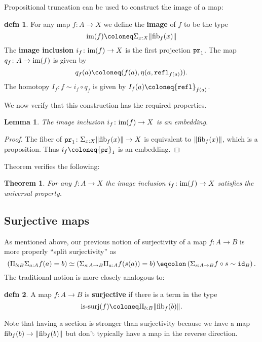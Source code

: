 \documentclass{amsart}
\theoremstyle{theorem}
\newtheorem*{thm}{Theorem}
\newtheorem*{lem}{Lemma}
\theoremstyle{definition}
\newtheorem*{defn}{defn}
\theoremstyle{remark}
\newcommand{\0}{\mathbbe{0}}
\newcommand{\1}{\mathbbe{1}}
\newcommand{\2}{\mathbbe{2}}
\newcommand{\3}{\mathbbe{3}}
\newcommand{\4}{\mathbbe{4}}
\newcommand{\term}[1]{{\textup{\texttt{#1}}}}
\newcommand{\type}[1]{{\textup{#1}}}
\newcommand{\id}{\term{id}}
\newcommand{\pr}{\term{pr}}
\newcommand{\refl}{\term{refl}}
\newcommand{\is}[1]{\type{is-{#1}}}
\newcommand{\fib}{\type{fib}}
\newcommand{\mere}[1]{\|{#1}\|}
\newcommand{\im}[1]{\type{im}(#1)}
\begin{document}
Propositional truncation can be used to construct the image of a map:

\begin{defn} For any map $f \colon A \to X$ we define the \textbf{image} of $f$ to be the type
\[ \im{f} \coloneq \Sigma_{x:X} \mere{\fib_f(x)}\]
The \textbf{image inclusion} $i_f \colon \im{f} \to X$ is the first projection $\pr_1$. The map $q_f \colon A \to \im{f}$ is given by
\[ q_f(a) \coloneq (f(a), \eta(a,\refl_{f(a)})).\] The homotopy $I_f : f \sim i_f \circ q_f$ is given by $I_f(a) \coloneq \refl_{f(a)}$.
\end{defn}

We now verify that this construction has the required properties.

\begin{lem} The image inclusion $i_f \colon \im{f} \to X$ is an embedding.
\end{lem}
\begin{proof}
The fiber of $\pr_1 \colon \Sigma_{x:X} \mere{\fib_f(x)} \to X$ is equivalent to $\mere{\fib_f(x)}$, which is a proposition. Thus $i_f \coloneq \pr_1$ is an embedding.
\end{proof}

Theorem \cite[15.1.7]{Rijke} verifies the following:

\begin{thm} For any $f \colon A \to X$ the image inclusion $i_f \colon \im{f} \to X$ satisfies the universal property.
\end{thm}

\subsection*{Surjective maps}

As mentioned above, our previous notion of surjectivity of a map $f \colon A \to B$ is more properly ``split surjectivity'' as 
\[ \left( \Pi_{b:B} \Sigma_{a:A} f(a) =b \right) \simeq \left( \Sigma_{s : A \to B} \Pi_{a:A} f(s(a)) = b\right) \eqcolon  \left( \Sigma_{s: A \to B} f \circ s \sim \id_B \right).\]
The traditional notion is more closely analogous to:

\begin{defn} A map $f \colon A \to B$ is \textbf{surjective} if there is a term in the type
\[ \is{surj}(f) \coloneq \Pi_{b:B} \mere{\fib_f(b)}.\]
\end{defn}

Note that having a section is stronger than surjectivity because we have a map $\fib_f(b) \to \mere{\fib_f(b)}$ but don't typically have a map in the reverse direction.
\end{document}
